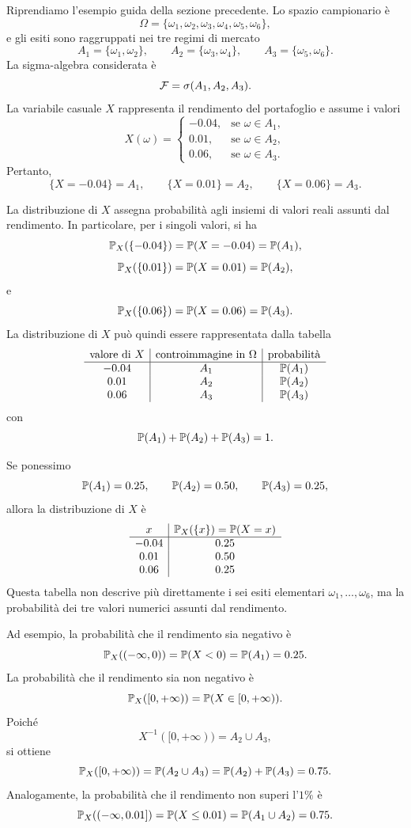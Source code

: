 \begin{example}
Riprendiamo l'esempio guida della sezione precedente. Lo spazio campionario \`{e}
\[
\Omega=\{\omega_1,\omega_2,\omega_3,\omega_4,\omega_5,\omega_6\},
\]
e gli esiti sono raggruppati nei tre regimi di mercato
\[
A_1=\{\omega_1,\omega_2\},
\qquad
A_2=\{\omega_3,\omega_4\},
\qquad
A_3=\{\omega_5,\omega_6\}.
\]
La sigma-algebra considerata \`{e}
\[
\mathcal{F}=\sigma(A_1,A_2,A_3).
\]
La variabile casuale $X$ rappresenta il rendimento del portafoglio e assume i
valori
\[
X(\omega)=
\begin{cases}
-0.04, & \mbox{se }\omega\in A_1,\\
 0.01, & \mbox{se }\omega\in A_2,\\
 0.06, & \mbox{se }\omega\in A_3.
\end{cases}
\]
Pertanto,
\[
\{X=-0.04\}=A_1,
\qquad
\{X=0.01\}=A_2,
\qquad
\{X=0.06\}=A_3.
\]

La distribuzione di $X$ assegna probabilit\`{a} agli insiemi di valori
reali assunti dal rendimento. In particolare, per i singoli valori, si ha
\[
\mathbb{P}_X(\{-0.04\})
=
\mathbb{P}(X=-0.04)
=
\mathbb{P}(A_1),
\]
\[
\mathbb{P}_X(\{0.01\})
=
\mathbb{P}(X=0.01)
=
\mathbb{P}(A_2),
\]
e
\[
\mathbb{P}_X(\{0.06\})
=
\mathbb{P}(X=0.06)
=
\mathbb{P}(A_3).
\]
La distribuzione di $X$ pu\`{o} quindi essere rappresentata dalla tabella
\[
\begin{array}{c|c|c}
\mbox{valore di } X & \mbox{controimmagine in } \Omega
& \mbox{probabilit\`{a}}\\
\hline
-0.04 & A_1 & \mathbb{P}(A_1)\\
 0.01 & A_2 & \mathbb{P}(A_2)\\
 0.06 & A_3 & \mathbb{P}(A_3)
\end{array}
\]
con
\[
\mathbb{P}(A_1)+\mathbb{P}(A_2)+\mathbb{P}(A_3)=1.
\]

Se ponessimo
\[
\mathbb{P}(A_1)=0.25,
\qquad
\mathbb{P}(A_2)=0.50,
\qquad
\mathbb{P}(A_3)=0.25,
\]
allora la distribuzione di $X$ \`{e}
\[
\begin{array}{c|c}
x & \mathbb{P}_X(\{x\})=\mathbb{P}(X=x)\\
\hline
-0.04 & 0.25\\
 0.01 & 0.50\\
 0.06 & 0.25
\end{array}
\]
Questa tabella non descrive pi\`{u} direttamente i sei esiti elementari
$\omega_1,\ldots,\omega_6$, ma la probabilit\`{a} dei tre valori numerici assunti
dal rendimento.

Ad esempio, la probabilit\`{a} che il rendimento sia negativo \`{e}
\[
\mathbb{P}_X((-\infty,0))
=
\mathbb{P}(X<0)
=
\mathbb{P}(A_1)
=
0.25.
\]
La probabilit\`{a} che il rendimento sia non negativo \`{e}
\[
\mathbb{P}_X([0,+\infty))
=
\mathbb{P}(X\in[0,+\infty)).
\]
Poich\'{e}
\[
X^{-1}([0,+\infty))=A_2\cup A_3,
\]
si ottiene
\[
\mathbb{P}_X([0,+\infty))
=
\mathbb{P}(A_2\cup A_3)
=
\mathbb{P}(A_2)+\mathbb{P}(A_3)
=
0.75.
\]
Analogamente, la probabilit\`{a} che il rendimento non superi l'$1\%$ \`{e}
\[
\mathbb{P}_X((-\infty,0.01])
=
\mathbb{P}(X\leq 0.01)
=
\mathbb{P}(A_1\cup A_2)
=
0.75.
\]
\end{example}

